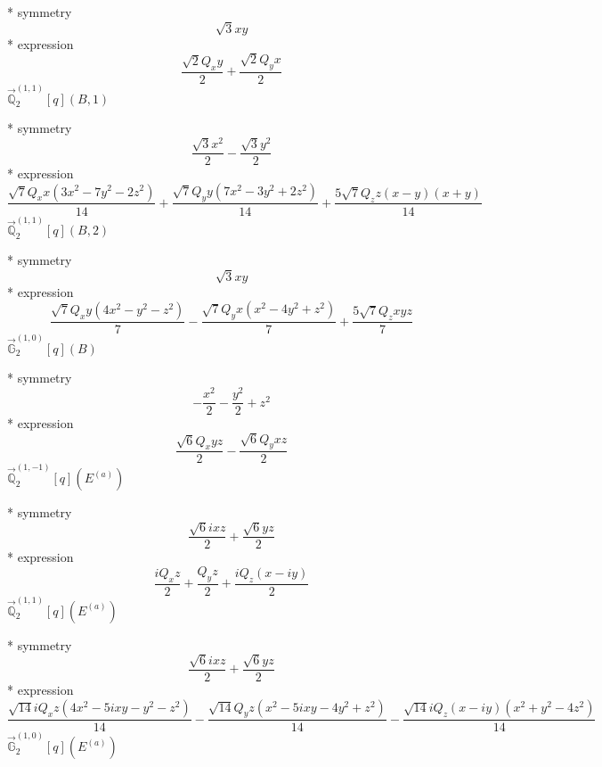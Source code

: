 \documentclass[fleqn,8pt]{jsarticle}
\begin{document}
\noindent\quad ** symmetry
\begin{dmath*}
\sqrt{3} x y
\end{dmath*}
\noindent\quad ** expression
\begin{dmath*}
\frac{\sqrt{2} Q_{x} y}{2} + \frac{\sqrt{2} Q_{y} x}{2}
\end{dmath*}
\noindent\quad $\vec{\mathbb{Q}}_{2}^{(1,1)}[q](B,1)$

\noindent\quad ** symmetry
\begin{dmath*}
\frac{\sqrt{3} x^{2}}{2} - \frac{\sqrt{3} y^{2}}{2}
\end{dmath*}
\noindent\quad ** expression
\begin{dmath*}
\frac{\sqrt{7} Q_{x} x \left(3 x^{2} - 7 y^{2} - 2 z^{2}\right)}{14} + \frac{\sqrt{7} Q_{y} y \left(7 x^{2} - 3 y^{2} + 2 z^{2}\right)}{14} + \frac{5 \sqrt{7} Q_{z} z \left(x - y\right) \left(x + y\right)}{14}
\end{dmath*}
\noindent\quad $\vec{\mathbb{Q}}_{2}^{(1,1)}[q](B,2)$

\noindent\quad ** symmetry
\begin{dmath*}
\sqrt{3} x y
\end{dmath*}
\noindent\quad ** expression
\begin{dmath*}
\frac{\sqrt{7} Q_{x} y \left(4 x^{2} - y^{2} - z^{2}\right)}{7} - \frac{\sqrt{7} Q_{y} x \left(x^{2} - 4 y^{2} + z^{2}\right)}{7} + \frac{5 \sqrt{7} Q_{z} x y z}{7}
\end{dmath*}
\noindent\quad $\vec{\mathbb{G}}_{2}^{(1,0)}[q](B)$

\noindent\quad ** symmetry
\begin{dmath*}
- \frac{x^{2}}{2} - \frac{y^{2}}{2} + z^{2}
\end{dmath*}
\noindent\quad ** expression
\begin{dmath*}
\frac{\sqrt{6} Q_{x} y z}{2} - \frac{\sqrt{6} Q_{y} x z}{2}
\end{dmath*}
\noindent\quad $\vec{\mathbb{Q}}_{2}^{(1,-1)}[q](E^{(a)})$

\noindent\quad ** symmetry
\begin{dmath*}
\frac{\sqrt{6} i x z}{2} + \frac{\sqrt{6} y z}{2}
\end{dmath*}
\noindent\quad ** expression
\begin{dmath*}
\frac{i Q_{x} z}{2} + \frac{Q_{y} z}{2} + \frac{i Q_{z} \left(x - i y\right)}{2}
\end{dmath*}
\noindent\quad $\vec{\mathbb{Q}}_{2}^{(1,1)}[q](E^{(a)})$

\noindent\quad ** symmetry
\begin{dmath*}
\frac{\sqrt{6} i x z}{2} + \frac{\sqrt{6} y z}{2}
\end{dmath*}
\noindent\quad ** expression
\begin{dmath*}
\frac{\sqrt{14} i Q_{x} z \left(4 x^{2} - 5 i x y - y^{2} - z^{2}\right)}{14} - \frac{\sqrt{14} Q_{y} z \left(x^{2} - 5 i x y - 4 y^{2} + z^{2}\right)}{14} - \frac{\sqrt{14} i Q_{z} \left(x - i y\right) \left(x^{2} + y^{2} - 4 z^{2}\right)}{14}
\end{dmath*}
\noindent\quad $\vec{\mathbb{G}}_{2}^{(1,0)}[q](E^{(a)})$
\end{document}
